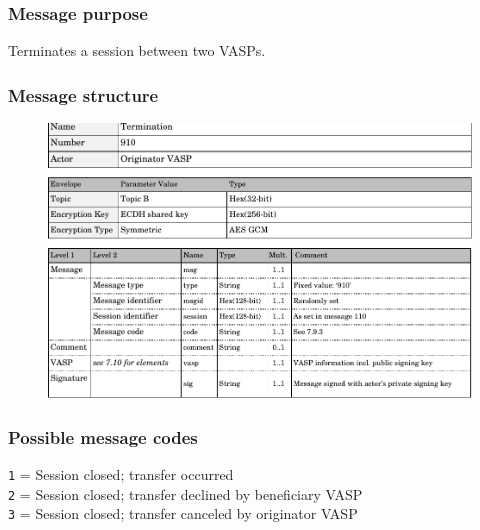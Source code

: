 \documentclass{article}
\begin{document}
\subsubsection{Message purpose}
Terminates a session between two VASPs.

\subsubsection{Message structure}
\begin{figure}[h]
    \centering
    \includegraphics[width=\textwidth]{g26.pdf}
\end{figure}
\subsubsection{Possible message codes}
\verb+1+ = Session closed; transfer occurred\\
\verb+2+ = Session closed; transfer declined by beneficiary VASP\\
\verb+3+ = Session closed; transfer canceled by originator VASP\\
\newpage
\end{document}
